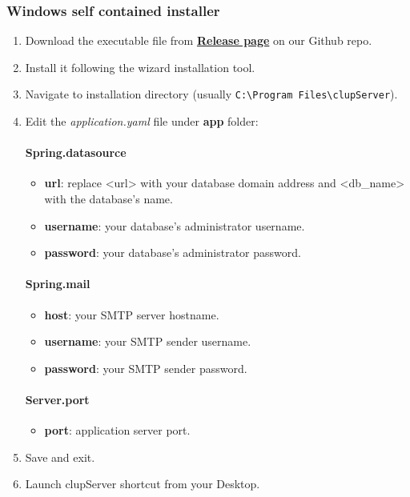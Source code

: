 \documentclass[table, 12pt]{article}
\begin{document}
\subsubsection{Windows self contained installer}
\begin{enumerate}
    \item Download the executable file from \textbf{\href{https://github.com/PiroX4256/SE2-Piemonti-Pirovano-Sonnino/releases}{Release page}} on our Github repo.
    \item Install it following the wizard installation tool.
    \item Navigate to installation directory (usually \texttt{C:\textbackslash{}Program Files\textbackslash{}clupServer}).
    \item Edit the \textit{application.yaml} file under \textbf{app} folder:\\
          \paragraph{Spring.datasource}
          \begin{itemize}
              \item \textbf{url}: replace <url> with your database domain address and \textless{}db\_name\textgreater{} with the database's name.
              \item \textbf{username}: your database's administrator username.
              \item \textbf{password}: your database's administrator password.
          \end{itemize}
          \paragraph{Spring.mail}
          \begin{itemize}
              \item \textbf{host}: your SMTP server hostname.
              \item \textbf{username}: your SMTP sender username.
              \item \textbf{password}: your SMTP sender password.
          \end{itemize}
          \paragraph{Server.port}
          \begin{itemize}
              \item \textbf{port}: application server port.
          \end{itemize}
    \item Save and exit.
    \item Launch clupServer shortcut from your Desktop.
\end{enumerate}
\end{document}
